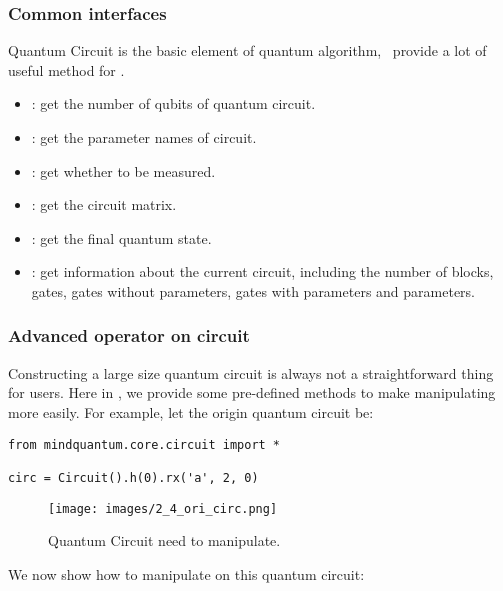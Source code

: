 \subsubsection{Common interfaces}

Quantum Circuit is the basic element of quantum algorithm, \MindQuantum\ provide a lot of useful method for \Circuit.

\begin{itemize}
    \item \propnqubits: get the number of qubits of quantum circuit.
    \item \propparamsname: get the parameter names of circuit.
    \item \prophasmeasuregate: get whether to be measured.
    \item \methodmatrix: get the circuit matrix.
    \item \methodgetqs: get the final quantum state.
    \item \methodsummary: get information about the current circuit, including the number of blocks, gates, gates without parameters, gates with parameters and parameters.
\end{itemize}

\subsubsection{Advanced operator on circuit}

Constructing a large size quantum circuit is always not a straightforward thing for users. Here in \MindQuantum, we provide some pre-defined methods to make manipulating \Circuit more easily. For example, let the origin quantum circuit be:

\begin{lstlisting}
from mindquantum.core.circuit import *

circ = Circuit().h(0).rx('a', 2, 0)
\end{lstlisting}

\begin{figure}[H]
    \begin{center}
        \texttt{[image: images/2\_4\_ori\_circ.png]}
    \end{center}
    \caption{Quantum Circuit need to manipulate.}
\end{figure}
We now show how to manipulate on this quantum circuit:


